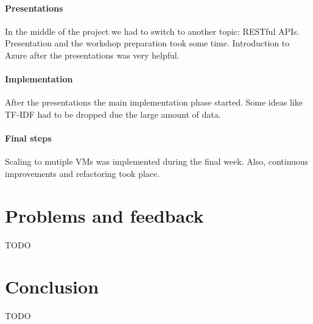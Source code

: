 \documentclass[DIV=calc, paper=a4, fontsize=11pt, twocolumn]{scrartcl}
\begin{document}
\paragraph{Presentations}
In the middle of the project we had to switch to another topic: RESTful APIs.
Presentation and the workshop preparation took some time. 
Introduction to Azure after the presentations was very helpful.

\paragraph{Implementation}
After the presentations the main implementation phase started.
Some ideas like TF-IDF had to be dropped due the large amount of data.


\paragraph{Final steps}
Scaling to mutiple VMs was implemented during the final week. Also, continuous improvements and refactoring took place.


\section*{Problems and feedback}
TODO



\section*{Conclusion}
TODO






%
% 

\end{document}
